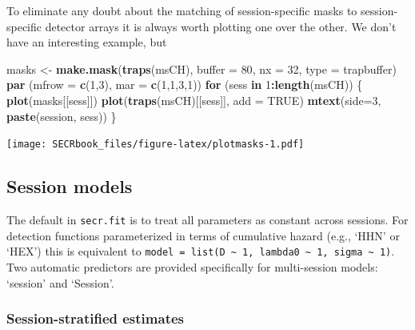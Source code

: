 \documentclass[
]{book}
\newenvironment{Shaded}{\begin{snugshade}}{\end{snugshade}}
\newcommand{\AttributeTok}[1]{\textcolor[rgb]{0.13,0.29,0.53}{#1}}
\newcommand{\ConstantTok}[1]{\textcolor[rgb]{0.56,0.35,0.01}{#1}}
\newcommand{\ControlFlowTok}[1]{\textcolor[rgb]{0.13,0.29,0.53}{\textbf{#1}}}
\newcommand{\DecValTok}[1]{\textcolor[rgb]{0.00,0.00,0.81}{#1}}
\newcommand{\FunctionTok}[1]{\textcolor[rgb]{0.13,0.29,0.53}{\textbf{#1}}}
\newcommand{\NormalTok}[1]{#1}
\newcommand{\OtherTok}[1]{\textcolor[rgb]{0.56,0.35,0.01}{#1}}
\newcommand{\SpecialCharTok}[1]{\textcolor[rgb]{0.81,0.36,0.00}{\textbf{#1}}}
\newcommand{\StringTok}[1]{\textcolor[rgb]{0.31,0.60,0.02}{#1}}
\begin{document}
To eliminate any doubt about the matching of session-specific masks to session-specific detector arrays it is always worth plotting one over the other. We don't have an interesting example, but

\begin{Shaded}
\begin{Highlighting}[]
\NormalTok{masks }\OtherTok{\textless{}{-}} \FunctionTok{make.mask}\NormalTok{(}\FunctionTok{traps}\NormalTok{(msCH), }\AttributeTok{buffer =} \DecValTok{80}\NormalTok{, }\AttributeTok{nx =} \DecValTok{32}\NormalTok{, }\AttributeTok{type =} \StringTok{\textquotesingle{}trapbuffer\textquotesingle{}}\NormalTok{)}
\FunctionTok{par}\NormalTok{ (}\AttributeTok{mfrow =} \FunctionTok{c}\NormalTok{(}\DecValTok{1}\NormalTok{,}\DecValTok{3}\NormalTok{), }\AttributeTok{mar =} \FunctionTok{c}\NormalTok{(}\DecValTok{1}\NormalTok{,}\DecValTok{1}\NormalTok{,}\DecValTok{3}\NormalTok{,}\DecValTok{1}\NormalTok{))}
\ControlFlowTok{for}\NormalTok{ (sess }\ControlFlowTok{in} \DecValTok{1}\SpecialCharTok{:}\FunctionTok{length}\NormalTok{(msCH)) \{}
    \FunctionTok{plot}\NormalTok{(masks[[sess]])}
    \FunctionTok{plot}\NormalTok{(}\FunctionTok{traps}\NormalTok{(msCH)[[sess]], }\AttributeTok{add =} \ConstantTok{TRUE}\NormalTok{)}
    \FunctionTok{mtext}\NormalTok{(}\AttributeTok{side=}\DecValTok{3}\NormalTok{, }\FunctionTok{paste}\NormalTok{(}\StringTok{\textquotesingle{}session\textquotesingle{}}\NormalTok{, sess))}
\NormalTok{\}}
\end{Highlighting}
\end{Shaded}

\texttt{[image: SECRbook\_files/figure-latex/plotmasks-1.pdf]}

\subsection{Session models}\label{session-models}

The default in \texttt{secr.fit} is to treat all parameters as constant across sessions. For detection functions parameterized in terms of cumulative hazard (e.g., `HHN' or `HEX') this is equivalent to \texttt{model\ =\ list(D\ \textasciitilde{}\ 1,\ lambda0\ \textasciitilde{}\ 1,\ sigma\ \textasciitilde{}\ 1)}. Two automatic predictors are provided specifically for multi-session models: `session' and `Session'.

\subsubsection{Session-stratified estimates}\label{session-stratified-estimates}
\end{document}
